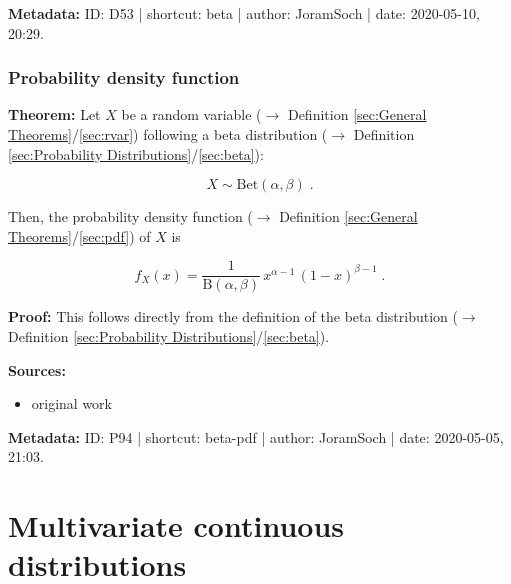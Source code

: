 \documentclass[a4paper,12pt,twoside]{book}
\begin{document}
\vspace{1em}
\textbf{Metadata:} ID: D53 | shortcut: beta | author: JoramSoch | date: 2020-05-10, 20:29.
\vspace{1em}



\subsubsection[\textbf{Probability density function}]{Probability density function} \label{sec:beta-pdf}
\setcounter{equation}{0}

\textbf{Theorem:} Let $X$ be a random variable ($\rightarrow$ Definition \ref{sec:General Theorems}/\ref{sec:rvar}) following a beta distribution ($\rightarrow$ Definition \ref{sec:Probability Distributions}/\ref{sec:beta}):

\begin{equation} \label{eq:beta-pdf-beta}
X \sim \mathrm{Bet}(\alpha, \beta) \; .
\end{equation}

Then, the probability density function ($\rightarrow$ Definition \ref{sec:General Theorems}/\ref{sec:pdf}) of $X$ is

\begin{equation} \label{eq:beta-pdf-beta-pdf}
f_X(x) = \frac{1}{\mathrm{B}(\alpha, \beta)} \, x^{\alpha-1} \, (1-x)^{\beta-1} \; .
\end{equation}


\vspace{1em}
\textbf{Proof:} This follows directly from the definition of the beta distribution ($\rightarrow$ Definition \ref{sec:Probability Distributions}/\ref{sec:beta}).


\vspace{1em}
\textbf{Sources:}
\begin{itemize}
\item original work\end{itemize}


\vspace{1em}
\textbf{Metadata:} ID: P94 | shortcut: beta-pdf | author: JoramSoch | date: 2020-05-05, 21:03.
\vspace{1em}



\pagebreak
\section{Multivariate continuous distributions}
\end{document}
